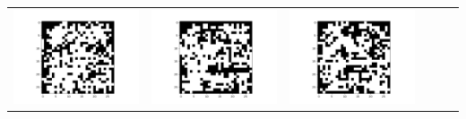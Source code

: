 \documentclass[12pt]{report}
\begin{document}
\begin{table}[H]
\begin{tabular}{  c  c  c  c  c  c }
\begin{minipage}{.15\textwidth}
      \includegraphics[scale=0.2]{BM_b4.png}
    \end{minipage} &
    \begin{minipage}{.15\textwidth}
      \includegraphics[scale=0.2]{BM_b16.png}
    \end{minipage} &
    \begin{minipage}{.15\textwidth}
      \includegraphics[scale=0.2]{BM_b40.png}

\end{minipage}
\end{tabular}
\end{table}
\end{document}

